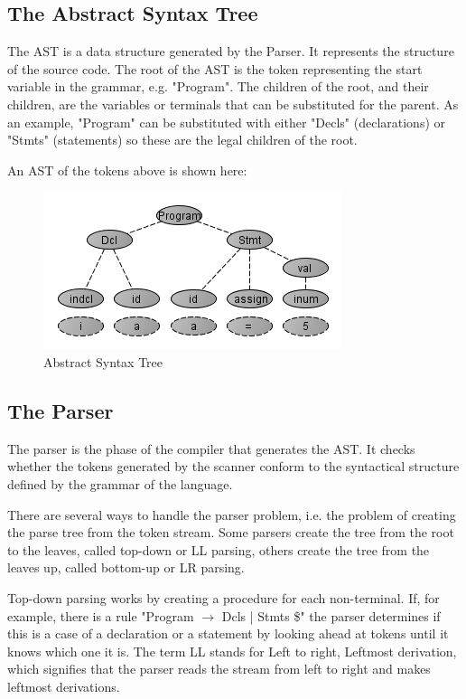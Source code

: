 \subsection{The Abstract Syntax Tree}
The AST is a data structure generated by the Parser. It represents the structure of the source code. The root of the AST is the token representing the start variable in the grammar, e.g. "Program". The children of the root, and their children, are the variables or terminals that can be substituted for the parent. As an example, "Program" can be substituted with either "Decls" (declarations) or "Stmts" (statements) so these are the legal children of the root.

An AST of the tokens above is shown here:

\begin{figure}[ht]
	\centering
		\includegraphics[scale = 0.7]{img/ast.png}
	\caption{Abstract Syntax Tree}
	\label{fig:ast}
\end{figure} 

\newpage
\subsection{The Parser}

The parser is the phase of the compiler that generates the AST. It checks whether the tokens generated by the scanner conform to the syntactical structure defined by the grammar of the language. 

There are several ways to handle the parser problem, i.e. the problem of creating the parse tree from the token stream. Some parsers create the tree from the root to the leaves, called top-down or LL parsing, others create the tree from the leaves up, called bottom-up or LR parsing. 

Top-down parsing works by creating a procedure for each non-terminal. If, for example, there is a rule "Program $\rightarrow$ Dcls | Stmts \$" the parser determines if this is a case of a declaration or a statement by looking ahead at tokens until it knows which one it is. The term LL stands for Left to right, Leftmost derivation, which signifies that the parser reads the stream from left to right and makes leftmost derivations.

